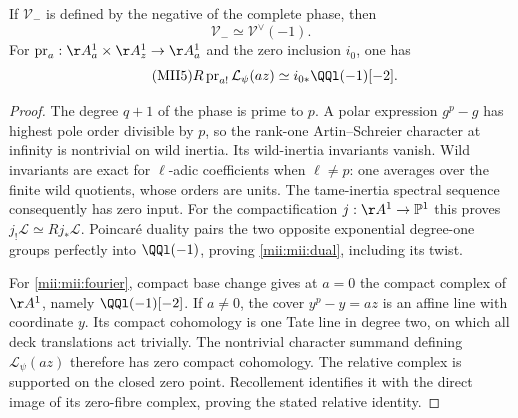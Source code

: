 \begin{lemma}\label{mii:mii:fourierlemma}
If $\mathcal V_-$ is defined by the negative of the complete phase, then
\begin{equation}\tag{MII4}\label{mii:mii:dual}
 \mathcal V_-\simeq\mathcal V^\vee(-1).
\end{equation}
For $\operatorname{pr}_a:\AA_a^1\times\AA_z^1\to\AA_a^1$ and the zero
inclusion $i_0$, one has
\begin{equation}\tag{MII5}\label{mii:mii:fourier}
 R\operatorname{pr}_{a!}\mathcal L_\psi(az)
       \simeq i_{0*}\QQl(-1)[-2].
\end{equation}
\end{lemma}
\begin{proof}
The degree $q+1$ of the phase is prime to $p$. A polar expression $g^p-g$
has highest pole order divisible by $p$, so the rank-one Artin--Schreier
character at infinity is nontrivial on wild inertia. Its wild-inertia
invariants vanish. Wild invariants are exact for $\ell$-adic coefficients
when $\ell\ne p$: one averages over the finite wild quotients, whose orders
are units. The tame-inertia spectral sequence consequently has zero input.
For the compactification $j:\AA^1\to\mathbb P^1$ this proves
$j_!\mathcal L\simeq Rj_*\mathcal L$. Poincar\'e duality pairs the two
opposite exponential degree-one groups perfectly into $\QQl(-1)$, proving
\eqref{mii:mii:dual}, including its twist.

For \eqref{mii:mii:fourier}, compact base change gives at $a=0$ the compact
complex of $\AA^1$, namely $\QQl(-1)[-2]$. If $a\ne0$, the cover
$y^p-y=az$ is an affine line with coordinate $y$. Its compact cohomology is
one Tate line in degree two, on which all deck translations act trivially.
The nontrivial character summand defining $\mathcal L_\psi(az)$ therefore
has zero compact cohomology. The relative complex is supported on the
closed zero point. Recollement identifies it with the direct image of its
zero-fibre complex, proving the stated relative identity.
\end{proof}

